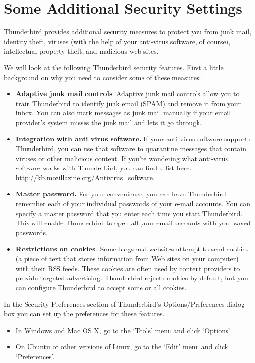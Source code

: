 \section{Some Additional Security Settings}

Thunderbird provides additional security measures to protect you from
junk mail, identity theft, viruses (with the help of your anti-virus
software, of course), intellectual property theft, and malicious web
sites.

We will look at the following Thunderbird security features. First a
little background on why you need to consider some of these measures:

\begin{itemize}
\item
  \textbf{Adaptive junk mail controls}. Adaptive junk mail controls
  allow you to train Thunderbird to identify junk email (SPAM) and
  remove it from your inbox. You can also mark messages as junk mail
  manually if your email provider's system misses the junk mail and lets
  it go through.
\item
  \textbf{Integration with anti-virus software.} If your anti-virus
  software supports Thunderbird, you can use that software to quarantine
  messages that contain viruses or other malicious content. If you're
  wondering what anti-virus software works with Thunderbird, you can
  find a list here: http://kb.mozillazine.org/Antivirus\_software.
\item
  \textbf{Master password.} For your convenience, you can have
  Thunderbird remember each of your individual passwords of your e-mail
  accounts. You can specify a master password that you enter each time
  you start Thunderbird. This will enable Thunderbird to open all your
  email accounts with your saved passwords.
\item
  \textbf{Restrictions on cookies.} Some blogs and websites attempt to
  send cookies (a piece of text that stores information from Web sites
  on your computer) with their RSS feeds. These cookies are often used
  by content providers to provide targeted advertising. Thunderbird
  rejects cookies by default, but you can configure Thunderbird to
  accept some or all cookies.
\end{itemize}
In the Security Preferences section of Thunderbird's Options/Preferences
dialog box you can set up the preferences for these features.

\begin{itemize}
\item
  In Windows and Mac OS X, go to the `Tools' menu and click `Options'.
\item
  On Ubuntu or other versions of Linux, go to the `Edit' menu and click
  `Preferences'.
\end{itemize}
